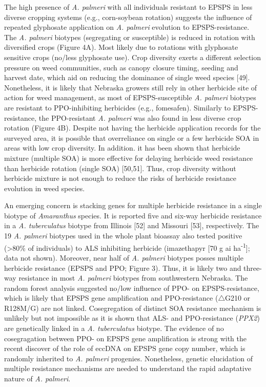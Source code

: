 \documentclass[10pt,letterpaper]{article}
\begin{document}
The high presence of \emph{A. palmeri} with all individuals resistant to
EPSPS in less diverse cropping systems (e.g., corn-soybean rotation)
suggests the influence of repeated glyphosate application on \emph{A.
palmeri} evolution to EPSPS-resistance. The \emph{A. palmeri} biotypes
(segregating or susceptible) is reduced in rotation with diversified
crops (Figure 4A). Most likely due to rotations with glyphosate
sensitive crops (no/less glyphosate use). Crop diversity exerts a
different selection pressure on weed communities, such as canopy closure
timing, seeding and harvest date, which aid on reducing the dominance of
single weed species {[}49{]}. Nonetheless, it is likely that Nebraska
growers still rely in other herbicide site of action for weed
management, as most of EPSPS-susceptible \emph{A. palmeri} biotypes are
resistant to PPO-inhibiting herbicides (e.g., fomesafen). Similarly to
EPSPS-resistance, the PPO-resistant \emph{A. palmeri} was also found in
less diverse crop rotation (Figure 4B). Despite not having the herbicide
application records for the surveyed area, it is possible that
overreliance on single or a few herbicide SOA in areas with low crop
diversity. In addition. it has been shown that herbicide mixture
(multiple SOA) is more effective for delaying herbicide weed resistance
than herbicide rotation (single SOA) {[}50,51{]}. Thus, crop diversity
without herbicide mixture is not enough to reduce the risks of herbicide
resistance evolution in weed species.

An emerging concern is stacking genes for multiple herbicide resistance
in a single biotype of \emph{Amaranthus} species. It is reported five
and six-way herbicide resistance in a \emph{A. tuberculatus} biotype
from Illinois {[}52{]} and Missouri {[}53{]}, respectively. The 19
\emph{A. palmeri} biotypes used in the whole plant bioassay also tested
positive (\textgreater{}80\% of individuals) to ALS inhibiting herbicide
(imazethapyr {[}70 g ai ha\textsuperscript{-1}{]}; data not shown).
Moreover, near half of \emph{A. palmeri} biotypes posses multiple
herbicide resistance (EPSPS and PPO; Figure 3). Thus, it is likely two
and three-way resistance in most \emph{A. palmeri} biotypes from
southwestern Nebraska. The random forest analysis suggested no/low
influence of PPO- on EPSPS-resistance, which is likely that EPSPS gene
amplification and PPO-resistance (\(\triangle\)G210 or R128M/G) are not
linked. Cosegregation of distinct SOA resistance mechanism is unlikely
but not impossible as it is shown that ALS- and PPO-resistance
(\emph{PPX2}) are genetically linked in a \emph{A. tuberculatus}
biotype. The evidence of no cosegragation between PPO- on EPSPS gene
amplification is strong with the recent discover of the role of eccDNA
on EPSPS gene copy number, which is randomly inherited to \emph{A.
palmeri} progenies. Nonetheless, genetic elucidation of multiple
resistance mechanisms are needed to understand the rapid adaptative
nature of \emph{A. palmeri}.
\end{document}
